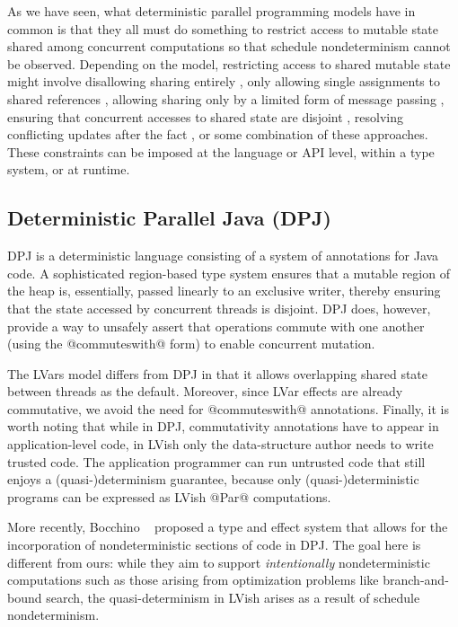 \documentclass{article}
\begin{document}
As we have seen, what deterministic parallel programming models have
in common is that they all must do something to restrict access to
mutable state shared among concurrent computations so that schedule
nondeterminism cannot be observed.  Depending on the model,
restricting access to shared mutable state might involve disallowing
sharing entirely \cite{dph}, only allowing single assignments to
shared references \cite{Tesler-1968, IStructures, CnC}, allowing
sharing only by a limited form of message passing \cite{Kahn-1974},
ensuring that concurrent accesses to shared state are disjoint
\cite{dpj-oopsla}, resolving conflicting updates after the fact
\cite{concurrent-revisions-haskell11}, or some combination of these
approaches.  These constraints can be imposed at the language or API
level, within a type system, or at runtime.

\subsection{Deterministic Parallel Java (DPJ)}

DPJ \cite{dpj-oopsla, dpj-hotpar09} is a deterministic language
consisting of a system of annotations for Java code.  A sophisticated
region-based type system ensures that a mutable region of the heap is,
essentially, passed linearly to an exclusive writer, thereby ensuring
that the state accessed by concurrent threads is disjoint.  DPJ does,
however, provide a way to unsafely assert that operations commute with
one another (using the @commuteswith@ form) to enable concurrent
mutation.

The LVars model differs from DPJ in that it allows overlapping shared
state between threads as the default.  Moreover, since LVar effects
are already commutative, we avoid the need for @commuteswith@
annotations.  Finally, it is worth noting that while in DPJ,
commutativity annotations have to appear in application-level code, in
LVish only the data-structure author needs to write trusted code. The
application programmer can run untrusted code that still enjoys a
(quasi-)determinism guarantee, because only (quasi-)deterministic
programs can be expressed as LVish @Par@ computations.

More recently, Bocchino \etal~\cite{dpj-popl} proposed a type and
effect system that allows for the incorporation of nondeterministic
sections of code in DPJ.  The goal here is different from ours: while
they aim to support \emph{intentionally} nondeterministic computations
such as those arising from optimization problems like branch-and-bound
search, the quasi-determinism in LVish arises as a result of schedule
nondeterminism.
\end{document}
